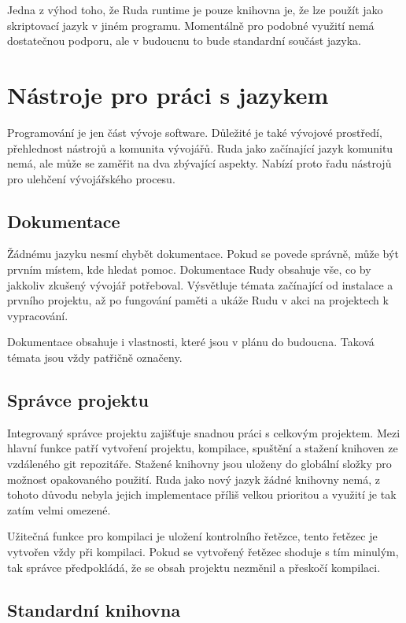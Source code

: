 \documentclass[12pt, a4paper,
twoside,        %
openright
]{report}
\let\oldchapter\chapter
\renewcommand{\chapter}{
	\clearpage
	\pagestyle{fancy}
	\oldchapter
}
\begin{document}
Jedna z výhod toho, že Ruda runtime je pouze knihovna je, že lze použít jako skriptovací jazyk v jiném programu. Momentálně pro podobné využití nemá dostatečnou podporu, ale v budoucnu to bude standardní součást jazyka.

\chapter{Nástroje pro práci s jazykem}

Programování je jen část vývoje software. Důležité je také vývojové prostředí, přehlednost nástrojů a komunita vývojářů. Ruda jako začínající jazyk komunitu nemá, ale může se zaměřit na dva zbývající aspekty. Nabízí proto řadu nástrojů pro ulehčení vývojářského procesu.

\section{Dokumentace}

Žádnému jazyku nesmí chybět dokumentace. Pokud se povede správně, může být prvním místem, kde hledat pomoc. Dokumentace Rudy obsahuje vše, co by jakkoliv zkušený vývojář potřeboval. Výsvětluje témata začínající od instalace a prvního projektu, až po fungování paměti a ukáže Rudu v akci na projektech k vypracování.

Dokumentace obsahuje i vlastnosti, které jsou v plánu do budoucna. Taková témata jsou vždy patřičně označeny.

\section{Správce projektu}

Integrovaný správce projektu zajišťuje snadnou práci s celkovým projektem. Mezi hlavní funkce patří vytvoření projektu, kompilace, spuštění a stažení knihoven ze vzdáleného git repozitáře. Stažené knihovny jsou uloženy do globální složky pro možnost opakovaného použití. Ruda jako nový jazyk žádné knihovny nemá, z tohoto důvodu nebyla jejich implementace příliš velkou prioritou a využití je tak zatím velmi omezené.

Užitečná funkce pro kompilaci je uložení kontrolního řetězce, tento řetězec je vytvořen vždy při kompilaci. Pokud se vytvořený řetězec shoduje s tím minulým, tak správce předpokládá, že se obsah projektu nezměnil a přeskočí kompilaci.

\section{Standardní knihovna}
\end{document}
